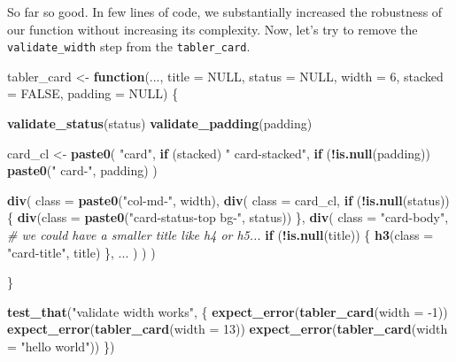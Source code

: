 \documentclass[]{book}
\newenvironment{Shaded}{\begin{snugshade}}{\end{snugshade}}
\newcommand{\CommentTok}[1]{\textcolor[rgb]{0.56,0.35,0.01}{\textit{#1}}}
\newcommand{\ControlFlowTok}[1]{\textcolor[rgb]{0.13,0.29,0.53}{\textbf{#1}}}
\newcommand{\DataTypeTok}[1]{\textcolor[rgb]{0.13,0.29,0.53}{#1}}
\newcommand{\DecValTok}[1]{\textcolor[rgb]{0.00,0.00,0.81}{#1}}
\newcommand{\KeywordTok}[1]{\textcolor[rgb]{0.13,0.29,0.53}{\textbf{#1}}}
\newcommand{\NormalTok}[1]{#1}
\newcommand{\OperatorTok}[1]{\textcolor[rgb]{0.81,0.36,0.00}{\textbf{#1}}}
\newcommand{\OtherTok}[1]{\textcolor[rgb]{0.56,0.35,0.01}{#1}}
\newcommand{\StringTok}[1]{\textcolor[rgb]{0.31,0.60,0.02}{#1}}
\begin{document}
So far so good. In few lines of code, we substantially increased the robustness of our function without increasing its complexity. Now, let's try to remove the \texttt{validate\_width} step from the \texttt{tabler\_card}.

\begin{Shaded}
\begin{Highlighting}[]
\NormalTok{tabler_card <-}\StringTok{ }\ControlFlowTok{function}\NormalTok{(..., }\DataTypeTok{title =} \OtherTok{NULL}\NormalTok{, }\DataTypeTok{status =} \OtherTok{NULL}\NormalTok{, }\DataTypeTok{width =} \DecValTok{6}\NormalTok{, }\DataTypeTok{stacked =} \OtherTok{FALSE}\NormalTok{, }\DataTypeTok{padding =} \OtherTok{NULL}\NormalTok{) \{}
  
  \KeywordTok{validate_status}\NormalTok{(status)}
  \KeywordTok{validate_padding}\NormalTok{(padding)}
  
\NormalTok{  card_cl <-}\StringTok{ }\KeywordTok{paste0}\NormalTok{(}
    \StringTok{"card"}\NormalTok{, }
    \ControlFlowTok{if}\NormalTok{ (stacked) }\StringTok{" card-stacked"}\NormalTok{,}
    \ControlFlowTok{if}\NormalTok{ (}\OperatorTok{!}\KeywordTok{is.null}\NormalTok{(padding)) }\KeywordTok{paste0}\NormalTok{(}\StringTok{" card-"}\NormalTok{, padding)}
\NormalTok{  )}
  
  \KeywordTok{div}\NormalTok{(}
    \DataTypeTok{class =} \KeywordTok{paste0}\NormalTok{(}\StringTok{"col-md-"}\NormalTok{, width),}
    \KeywordTok{div}\NormalTok{(}
      \DataTypeTok{class =}\NormalTok{ card_cl,}
      \ControlFlowTok{if}\NormalTok{ (}\OperatorTok{!}\KeywordTok{is.null}\NormalTok{(status)) \{}
        \KeywordTok{div}\NormalTok{(}\DataTypeTok{class =} \KeywordTok{paste0}\NormalTok{(}\StringTok{"card-status-top bg-"}\NormalTok{, status))}
\NormalTok{      \},}
      \KeywordTok{div}\NormalTok{(}
        \DataTypeTok{class =} \StringTok{"card-body"}\NormalTok{,}
        \CommentTok{# we could have a smaller title like h4 or h5...}
        \ControlFlowTok{if}\NormalTok{ (}\OperatorTok{!}\KeywordTok{is.null}\NormalTok{(title)) \{}
          \KeywordTok{h3}\NormalTok{(}\DataTypeTok{class =} \StringTok{"card-title"}\NormalTok{, title)}
\NormalTok{        \},}
\NormalTok{        ...}
\NormalTok{      )}
\NormalTok{    )}
\NormalTok{  )}
  
\NormalTok{\}}


\KeywordTok{test_that}\NormalTok{(}\StringTok{"validate width works"}\NormalTok{, \{}
  \KeywordTok{expect_error}\NormalTok{(}\KeywordTok{tabler_card}\NormalTok{(}\DataTypeTok{width =} \DecValTok{-1}\NormalTok{))}
  \KeywordTok{expect_error}\NormalTok{(}\KeywordTok{tabler_card}\NormalTok{(}\DataTypeTok{width =} \DecValTok{13}\NormalTok{))}
  \KeywordTok{expect_error}\NormalTok{(}\KeywordTok{tabler_card}\NormalTok{(}\DataTypeTok{width =} \StringTok{"hello world"}\NormalTok{))}
\NormalTok{\})}
\end{Highlighting}
\end{Shaded}
\end{document}
